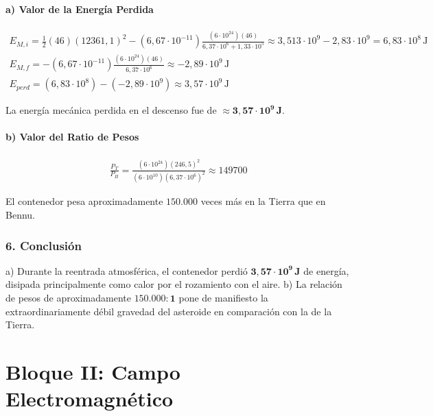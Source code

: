 \paragraph*{a) Valor de la Energía Perdida}
\begin{gather}
    E_{M,i} = \frac{1}{2}(46)(12361,1)^2 - (6,67\cdot10^{-11})\frac{(6\cdot10^{24})(46)}{6,37\cdot10^6 + 1,33\cdot10^5} \approx 3,513 \cdot 10^9 - 2,83 \cdot 10^9 = 6,83 \cdot 10^8 \, \text{J} \nonumber \\
    E_{M,f} = -(6,67\cdot10^{-11})\frac{(6\cdot10^{24})(46)}{6,37\cdot10^6} \approx -2,89 \cdot 10^9 \, \text{J} \nonumber \\
    E_{perd} = (6,83 \cdot 10^8) - (-2,89 \cdot 10^9) \approx 3,57 \cdot 10^9 \, \text{J}
\end{gather}
\begin{cajaresultado}
    La energía mecánica perdida en el descenso fue de $\boldsymbol{\approx 3,57 \cdot 10^9 \, J}$.
\end{cajaresultado}

\paragraph*{b) Valor del Ratio de Pesos}
\begin{gather}
    \frac{P_T}{P_B} = \frac{(6\cdot10^{24})(246,5)^2}{(6\cdot10^{10})(6,37\cdot10^6)^2} \approx 149700
\end{gather}
\begin{cajaresultado}
    El contenedor pesa aproximadamente $\boldsymbol{150.000}$ veces más en la Tierra que en Bennu.
\end{cajaresultado}

\subsubsection*{6. Conclusión}
\begin{cajaconclusion}
    a) Durante la reentrada atmosférica, el contenedor perdió $\mathbf{3,57 \cdot 10^9 \, J}$ de energía, disipada principalmente como calor por el rozamiento con el aire.
    b) La relación de pesos de aproximadamente $\mathbf{150.000 : 1}$ pone de manifiesto la extraordinariamente débil gravedad del asteroide en comparación con la de la Tierra.
\end{cajaconclusion}

\newpage

\section{Bloque II: Campo Electromagnético}
\label{sec:em_2025_jun_res_1}

